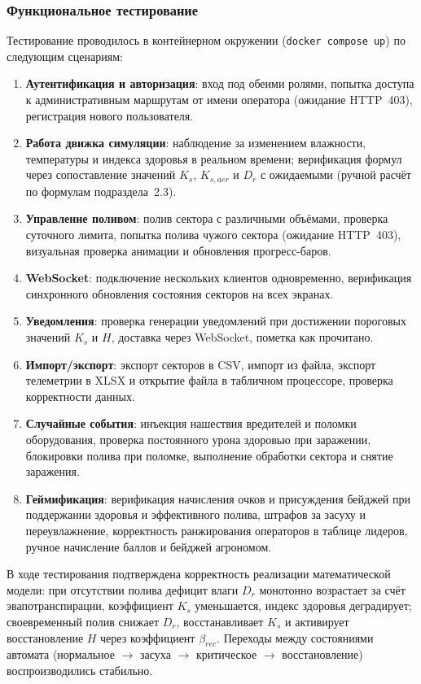 \subsubsection{Функциональное тестирование}

Тестирование проводилось в контейнерном окружении
(\texttt{docker compose up}) по следующим сценариям:

\begin{enumerate}
    \item \textbf{Аутентификация и авторизация}: вход под
    обеими ролями, попытка доступа к административным
    маршрутам от имени оператора (ожидание HTTP~403),
    регистрация нового пользователя.
    \item \textbf{Работа движка симуляции}: наблюдение
    за изменением влажности, температуры и индекса здоровья
    в реальном времени; верификация формул через сопоставление
    значений $K_s$, $K_{s,aer}$ и $D_r$ с ожидаемыми
    (ручной расчёт по формулам подраздела~2.3).
    \item \textbf{Управление поливом}: полив сектора с
    различными объёмами, проверка суточного лимита,
    попытка полива чужого сектора (ожидание HTTP~403),
    визуальная проверка анимации и обновления прогресс-баров.
    \item \textbf{WebSocket}: подключение нескольких
    клиентов одновременно, верификация синхронного
    обновления состояния секторов на всех экранах.
    \item \textbf{Уведомления}: проверка генерации
    уведомлений при достижении пороговых значений $K_s$
    и $H$, доставка через WebSocket, пометка как прочитано.
    \item \textbf{Импорт/экспорт}: экспорт секторов в CSV,
    импорт из файла, экспорт телеметрии в XLSX и открытие
    файла в табличном процессоре, проверка корректности данных.
    \item \textbf{Случайные события}: инъекция нашествия
    вредителей и поломки оборудования, проверка постоянного
    урона здоровью при заражении, блокировки полива при
    поломке, выполнение обработки сектора и снятие заражения.
    \item \textbf{Геймификация}: верификация начисления очков
    и присуждения бейджей при поддержании здоровья и
    эффективного полива, штрафов за засуху и переувлажнение,
    корректность ранжирования операторов в таблице лидеров,
    ручное начисление баллов и бейджей агрономом.
\end{enumerate}

В ходе тестирования подтверждена корректность реализации
математической модели: при отсутствии полива дефицит влаги
$D_r$ монотонно возрастает за счёт эвапотранспирации,
коэффициент $K_s$ уменьшается, индекс здоровья деградирует;
своевременный полив снижает $D_r$, восстанавливает $K_s$
и активирует восстановление $H$ через коэффициент
$\beta_{rec}$. Переходы между состояниями автомата
(нормальное $\to$ засуха $\to$ критическое $\to$
восстановление) воспроизводились стабильно.
